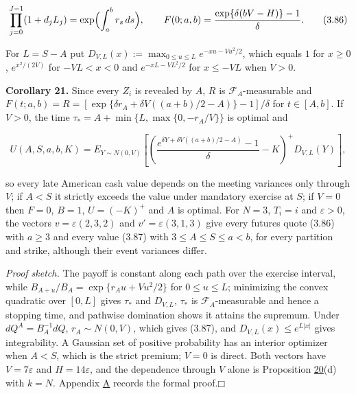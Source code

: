 \documentclass[11pt]{article}
\providecommand{\square}{\mdlgwhtsquare}
\begin{document}
\begin{equation*}
\prod_{j=0}^{J-1} (1 + d_j L_j) = \exp\Bigl( \int_a^b r_s\,ds \Bigr), \qquad F(0; a, b) = \frac{\exp\{\delta (bV - H)\} - 1}{\delta}. \tag{3.86}\label{eq:3.86}
\end{equation*}

For \(L = S - A\) put \(D_{V,L}(x) := \max_{0 \le u \le L} e^{-xu - Vu^2/2}\), which equals \(1\) for \(x \ge 0\), \(e^{x^2 / (2V)}\) for \(-VL < x < 0\) and \(e^{-xL - VL^2/2}\) for \(x \le -VL\) when \(V > 0\).

\label{res:Corollary-21}
\textbf{Corollary 21.} Since every \(Z_i\) is revealed by \(A\), \(R\) is \(\mathcal F_A\)-measurable and \(F(t; a, b) = R = [\exp\{\delta r_A + \delta V ((a + b)/2 - A)\} - 1] / \delta\) for \(t \in [A, b]\). If \(V > 0\), the time \(\tau_* = A + \min\{L, \max\{0, -r_A / V\}\}\) is optimal and

\begin{equation*}
U(A, S, a, b, K) = E_{Y \sim N(0, V)}\left[ \left( \frac{e^{\delta Y + \delta V ((a + b)/2 - A)} - 1}{\delta} - K \right)^+ D_{V,L}(Y) \right], \tag{3.87}\label{eq:3.87}
\end{equation*}

so every late American cash value depends on the meeting variances only through \(V\); if \(A < S\) it strictly exceeds the value under mandatory exercise at \(S\); if \(V = 0\) then \(F = 0\), \(B = 1\), \(U = (-K)^+\) and \(A\) is optimal. For \(N = 3\), \(T_i = i\) and \(\varepsilon > 0\), the vectors \(v = \varepsilon(2, 3, 2)\) and \(v' = \varepsilon(3, 1, 3)\) give every futures quote (3.86) with \(a \ge 3\) and every value (3.87) with \(3 \le A \le S \le a < b\), for every partition and strike, although their event variances differ.

\emph{Proof sketch.} The payoff is constant along each path over the exercise interval, while \(B_{A+u} / B_A = \exp\{r_A u + V u^2 / 2\}\) for \(0 \le u \le L\); minimizing the convex quadratic over \([0, L]\) gives \(\tau_*\) and \(D_{V,L}\), \(\tau_*\) is \(\mathcal F_A\)-measurable and hence a stopping time, and pathwise domination shows it attains the supremum. Under \(dQ^A = B_A^{-1} dQ\), \(r_A \sim N(0, V)\), which gives (3.87), and \(D_{V,L}(x) \le e^{L|x|}\) gives integrability. A Gaussian set of positive probability has an interior optimizer when \(A < S\), which is the strict premium; \(V = 0\) is direct. Both vectors have \(V = 7\varepsilon\) and \(H = 14\varepsilon\), and the dependence through \(V\) alone is Proposition \hyperref[res:Proposition-20]{20}(d) with \(k = N\). Appendix \hyperref[sec:A]{A} records the formal proof.\hfill$\square$
\end{document}
